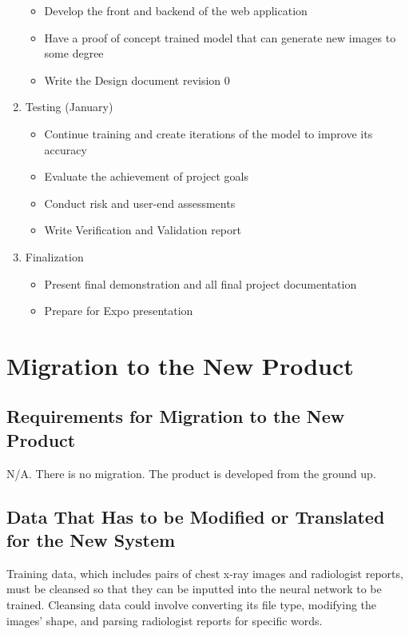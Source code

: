 \documentclass[12pt]{article}
\begin{document}
\begin{enumerate}
{\begin{itemize}
            \item Develop the front and backend of the web application
            \item Have a proof of concept trained model that can generate new images to some degree
            \item Write the Design document revision 0            
        \end{itemize}
    }
    \item {
        Testing (January)
        \begin{itemize}
            \item Continue training and create iterations of the model to improve its accuracy
            \item Evaluate the achievement of project goals
            \item Conduct risk and user-end assessments
            \item Write Verification and Validation report
        \end{itemize}
    }
    \item {
        Finalization
        \begin{itemize}
            \item Present final demonstration and all final project documentation
            \item Prepare for Expo presentation
        \end{itemize}
    }
\end{enumerate}

\section{Migration to the New Product}
\subsection{Requirements for Migration to the New Product}
N/A. There is no migration. The product is developed from the ground up.

\subsection{Data That Has to be Modified or Translated for the New System}
Training data, which includes pairs of chest x-ray images and radiologist reports, must be 
cleansed so that they can be inputted into the neural network to be trained. Cleansing data could 
involve converting its file type, modifying the images’ shape, and parsing radiologist reports for 
specific words.
\end{document}

